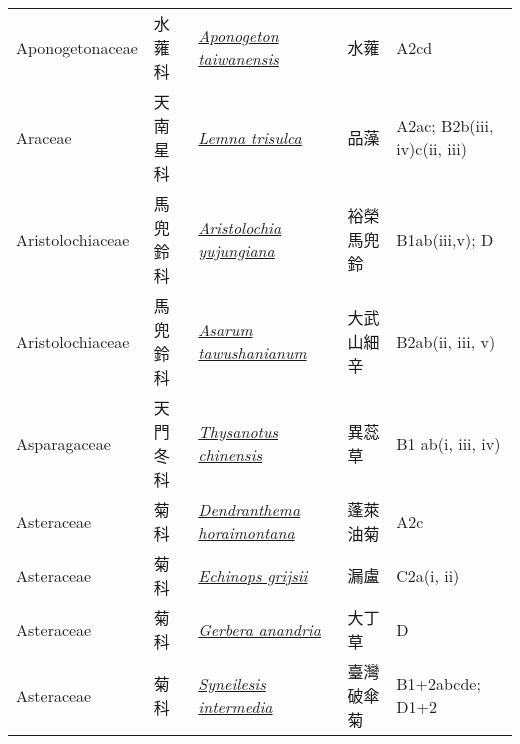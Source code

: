 {\begin{longtable}{L{2.5cm}L{2cm}L{5cm}L{2.5cm}L{3cm}}
    Aponogetonaceae & 水蕹科 & \href{http://www.theplantlist.org/tpl1.1/search?q=Aponogeton+taiwanensis}{\textit{Aponogeton taiwanensis} } & 水蕹 & A2cd    \\
    Araceae & 天南星科 & \href{http://www.theplantlist.org/tpl1.1/search?q=Lemna+trisulca}{\textit{Lemna trisulca} } & 品藻 & A2ac; B2b(iii, iv)c(ii, iii)    \\
    Aristolochiaceae & 馬兜鈴科 & \href{http://www.theplantlist.org/tpl1.1/search?q=Aristolochia+yujungiana}{\textit{Aristolochia yujungiana} } & 裕榮馬兜鈴 & B1ab(iii,v); D    \\
    Aristolochiaceae & 馬兜鈴科 & \href{http://www.theplantlist.org/tpl1.1/search?q=Asarum+tawushanianum}{\textit{Asarum tawushanianum} } & 大武山細辛 & B2ab(ii, iii, v)    \\
    Asparagaceae & 天門冬科 & \href{http://www.theplantlist.org/tpl1.1/search?q=Thysanotus+chinensis}{\textit{Thysanotus chinensis} } & 異蕊草 & B1 ab(i, iii, iv)    \\
    Asteraceae & 菊科 & \href{http://www.theplantlist.org/tpl1.1/search?q=Dendranthema+horaimontana}{\textit{Dendranthema horaimontana} } & 蓬萊油菊 & A2c    \\
    Asteraceae & 菊科 & \href{http://www.theplantlist.org/tpl1.1/search?q=Echinops+grijsii}{\textit{Echinops grijsii} } & 漏盧 & C2a(i, ii)    \\
    Asteraceae & 菊科 & \href{http://www.theplantlist.org/tpl1.1/search?q=Gerbera+anandria}{\textit{Gerbera anandria} } & 大丁草 & D    \\
    Asteraceae & 菊科 & \href{http://www.theplantlist.org/tpl1.1/search?q=Syneilesis+intermedia}{\textit{Syneilesis intermedia} } & 臺灣破傘菊 & B1+2abcde; D1+2    \\

\end{longtable}}
